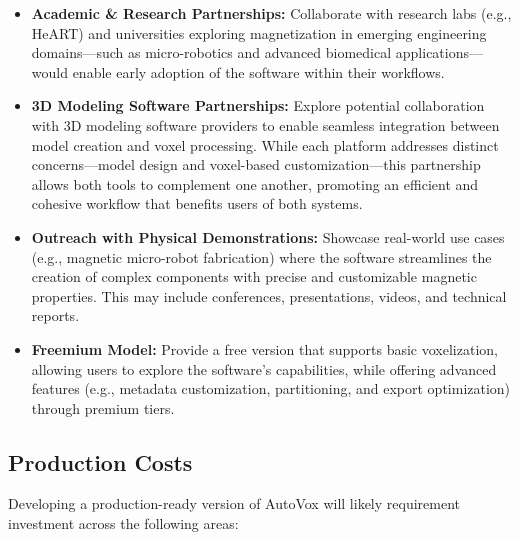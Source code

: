 \documentclass[12pt, titlepage]{article}
\begin{document}
\begin{itemize}
    \item \textbf{Academic \& Research Partnerships:} Collaborate with research labs (e.g., HeART) and universities exploring magnetization in emerging engineering domains—such as micro-robotics and advanced biomedical applications—would enable early adoption of the software within their workflows.
    \item \textbf{3D Modeling Software Partnerships:} Explore potential collaboration with 3D modeling software providers to enable seamless integration between model creation and voxel processing. While each platform addresses distinct concerns—model design and voxel-based customization—this partnership allows both tools to complement one another, promoting an efficient and cohesive workflow that benefits users of both systems.
    \item \textbf{Outreach with Physical Demonstrations:} Showcase real-world use cases (e.g., magnetic micro-robot fabrication) where the software streamlines the creation of complex components with precise and customizable magnetic properties. This may include conferences, presentations, videos, and technical reports.
    \item \textbf{Freemium Model:} Provide a free version that supports basic voxelization, allowing users to explore the software’s capabilities, while offering advanced features (e.g., metadata customization, partitioning, and export optimization) through premium tiers.
\end{itemize}    

\subsection{Production Costs}

Developing a production-ready version of AutoVox will likely requirement investment across the following areas:
\end{document}
